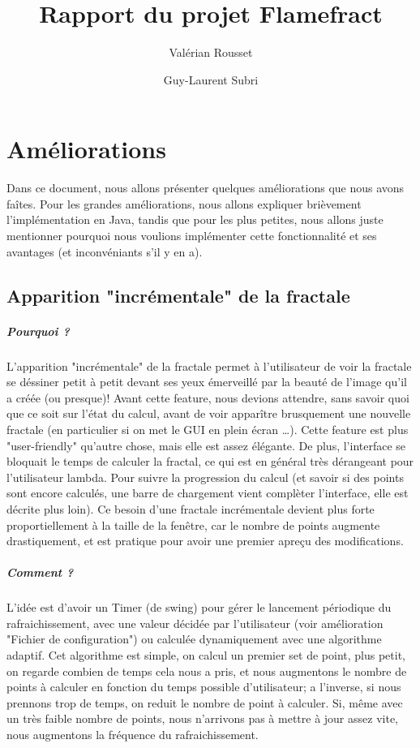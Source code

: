 \documentclass[a4paper]{report}
\author{Valérian Rousset \and Guy-Laurent Subri}
\title{Rapport du projet Flamefract}
\begin{document}
\maketitle

\chapter*{Améliorations}
Dans ce document, nous allons présenter quelques améliorations que nous avons faîtes. Pour les grandes améliorations, nous allons expliquer brièvement l'implémentation en Java, tandis que pour les plus petites, nous allons juste mentionner pourquoi nous voulions implémenter cette fonctionnalité et ses avantages (et inconvéniants s'il y en a).

\section*{Apparition "incrémentale" de la fractale}
\paragraph{Pourquoi ?}
L'apparition "incrémentale" de la fractale permet à l'utilisateur de voir la fractale se déssiner petit à petit devant ses yeux émerveillé par la beauté de l'image qu'il a créée (ou presque)! Avant cette feature, nous devions attendre, sans savoir quoi que ce soit sur l'état du calcul, avant de voir apparître brusquement une nouvelle fractale (en particulier si on met le GUI en plein écran \ldots). Cette feature est plus "user-friendly" qu'autre chose, mais elle est assez élégante. De plus, l'interface se bloquait le temps de calculer la fractal, ce qui est en général très dérangeant pour l'utilisateur lambda. Pour suivre la progression du calcul (et savoir si des points sont encore calculés, une barre de chargement vient complèter l'interface, elle est décrite plus loin). Ce besoin d'une fractale incrémentale devient plus forte proportiellement à la taille de la fenêtre, car le nombre de points augmente drastiquement, et est pratique pour avoir une premier apreçu des modifications.

\paragraph{Comment ?}
L'idée est d'avoir un Timer (de swing) pour gérer le lancement périodique du rafraichissement, avec une valeur décidée par l'utilisateur (voir amélioration "Fichier de configuration") ou calculée dynamiquement avec une algorithme adaptif. Cet algorithme est simple, on calcul un premier set de point, plus petit, on regarde combien de temps cela nous a pris, et nous augmentons le nombre de points à calculer en fonction du temps possible d'utilisateur; a l'inverse, si nous prennons trop de temps, on reduit le nombre de point à calculer. Si, même avec un très faible nombre de points, nous n'arrivons pas à mettre à jour assez vite, nous augmentons la fréquence du rafraichissement.
\end{document}
